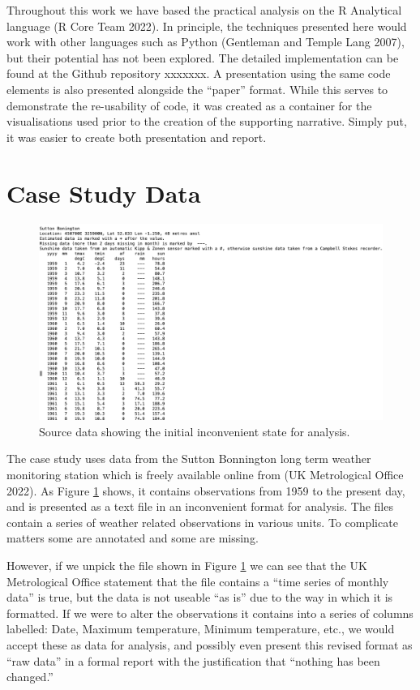 \documentclass[smallextended]{svjour3}       %
\begin{document}
Throughout this work we have based the practical analysis on the R Analytical language (R Core Team 2022). In principle, the techniques presented here would work with other languages such as Python (Gentleman and Temple Lang 2007), but their potential has not been explored. The detailed implementation can be found at the Github repository xxxxxxx. A presentation using the same code elements is also presented alongside the ``paper'' format. While this serves to demonstrate the re-usability of code, it was created as a container for the visualisations used prior to the creation of the supporting narrative. Simply put, it was easier to create both presentation and report.

\hypertarget{sec:case-study}{%
\section{Case Study Data}\label{sec:case-study}}

\begin{figure}

{\centering \includegraphics[width=0.7\linewidth]{image_Sutton_bonnington_data} 

}

\caption{Source data showing the initial inconvenient state for analysis.}\label{fig:ImageSuttonBonningtonData}
\end{figure}

The case study uses data from the Sutton Bonnington long term weather monitoring station which is freely available online from (UK Metrological Office 2022). As Figure \ref{fig:ImageSuttonBonningtonData} shows, it contains observations from 1959 to the present day, and is presented as a text file in an inconvenient format for analysis. The files contain a series of weather related observations in various units. To complicate matters some are annotated and some are missing.

However, if we unpick the file shown in Figure \ref{fig:ImageSuttonBonningtonData} we can see that the UK Metrological Office statement that the file contains a ``time series of monthly data'' is true, but the data is not useable ``as is'' due to the way in which it is formatted. If we were to alter the observations it contains into a series of columns labelled: Date, Maximum temperature, Minimum temperature, etc., we would accept these as data for analysis, and possibly even present this revised format as ``raw data'' in a formal report with the justification that ``nothing has been changed.''
\end{document}

